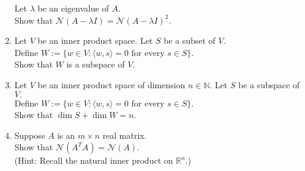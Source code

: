 \documentclass[12pt]{article}
\begin{document}
\begin{enumerate}
	Let $\lambda$ be an eigenvalue of $A.$\\
	Show that $\mathcal{N}(A - \lambda I) = \mathcal{N}(A - \lambda I)^2.$
	\item Let $V$ be an inner product space. Let $S$ be a subset of $V.$\\
	Define $W := \{w \in V : \langle w, s\rangle = 0 \text{ for every } s \in S\}.$\\
	Show that $W$ is a subspace of $V.$
	\item Let $V$ be an inner product space of dimension $n \in \mathbb{N}.$ Let $S$ be a subspace of $V.$\\
	Define $W := \{w \in V : \langle w, s\rangle = 0 \text{ for every } s \in S\}.$\\
	Show that $\dim S + \dim W = n.$
	\item Suppose $A$ is an $m \times n$ real matrix.\\
	Show that $\mathcal{N}(A^TA) = \mathcal{N}(A).$\\
	(Hint: Recall the natural inner product on $\mathbb{R}^n.$)
\end{enumerate}
\end{document}
